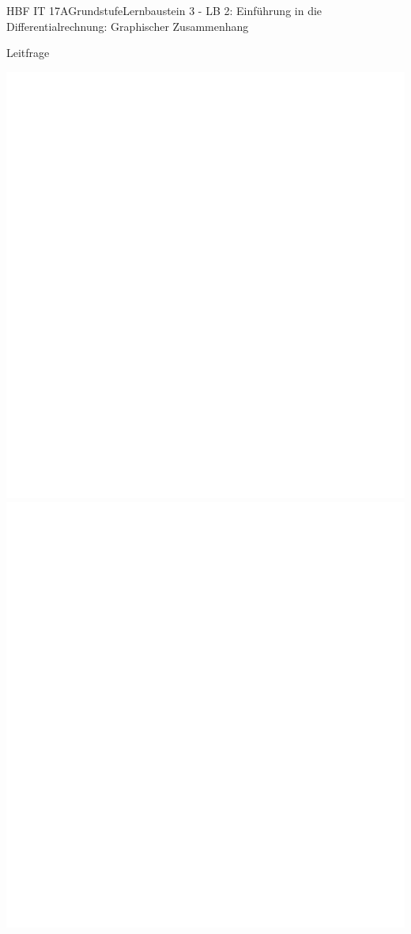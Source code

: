 \documentclass[oneside,openany,headings=optiontotoc,11pt,numbers=noenddot]{scrreprt}
\begin{document}
\begin{worksheet}{HBF IT 17A}{Grundstufe}{Lernbaustein 3 - LB 2: Einführung in die Differentialrechnung: Graphischer Zusammenhang}
		\begin{framed}
			\noindent
			\tiny{\color{codegray}Leitfrage}\\
		\end{framed}
		
		\begin{framed}
			\includegraphics[scale=0.75]{../empty.jpg}\\
			\includegraphics[scale=1.1]{../empty.jpg}
		\end{framed}
	

\end{worksheet}
\end{document}

